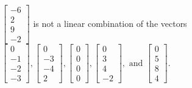 \begin{exercise}
\begin{exerciseStatement}
  \end{exerciseStatement}
  \begin{exerciseAnswer}
   \(\left[\begin{array}{c}
-6 \\
2 \\
9 \\
-2
\end{array}\right]\) 
  	 is not  
	a linear combination of the vectors \(\left[\begin{array}{c}
0 \\
-1 \\
-2 \\
-3
\end{array}\right] , \left[\begin{array}{c}
0 \\
-3 \\
-4 \\
2
\end{array}\right] , \left[\begin{array}{c}
0 \\
0 \\
0 \\
0
\end{array}\right] , \left[\begin{array}{c}
0 \\
3 \\
4 \\
-2
\end{array}\right] , \text{ and } \left[\begin{array}{c}
0 \\
5 \\
8 \\
4
\end{array}\right]\).

	
  


  \end{exerciseAnswer}
\end{exercise}